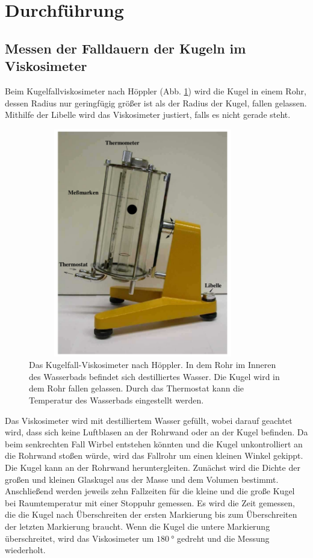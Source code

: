 \section{Durchführung}
\label{sec:Durchführung}

\subsection{Messen der Falldauern der Kugeln im Viskosimeter}
Beim Kugelfallviskosimeter nach Höppler (Abb. \ref{fig:viskosimeter}) wird die Kugel in einem Rohr, 
dessen Radius nur geringfügig größer ist als der Radius der Kugel, fallen gelassen.
Mithilfe der Libelle wird das Viskosimeter justiert, falls es nicht gerade steht.
\begin{figure}
    \centering
    \includegraphics[width=10cm, height=10cm]{build/viskosimeter.png}
    \caption{Das Kugelfall-Viskosimeter nach Höppler.
    In dem Rohr im Inneren des Wasserbads befindet sich destilliertes Wasser.
    Die Kugel wird in dem Rohr fallen gelassen. Durch das Thermostat kann die 
    Temperatur des Wasserbads eingestellt werden.}
    \label{fig:viskosimeter}
\end{figure}
\noindent Das Viskosimeter wird mit destilliertem Wasser gefüllt, wobei darauf geachtet wird, 
dass sich keine Luftblasen an der Rohrwand oder an der Kugel befinden. 
Da beim senkrechten Fall Wirbel entstehen könnten und die Kugel unkontrolliert an die 
Rohrwand stoßen würde, wird das Fallrohr um einen kleinen Winkel gekippt.
Die Kugel kann an der Rohrwand heruntergleiten.
\newline
Zunächst wird die Dichte der großen und kleinen Glaskugel aus der Masse und dem Volumen bestimmt.  
Anschließend werden jeweils zehn Fallzeiten für die kleine und die große Kugel bei Raumtemperatur 
mit einer Stoppuhr gemessen. Es wird die Zeit gemessen, die die Kugel nach Überschreiten der ersten Markierung
bis zum Überschreiten der letzten Markierung braucht.
Wenn die Kugel die untere Markierung überschreitet, 
wird das Viskosimeter um $\SI{180}{\degree}$ gedreht und die Messung wiederholt.  

